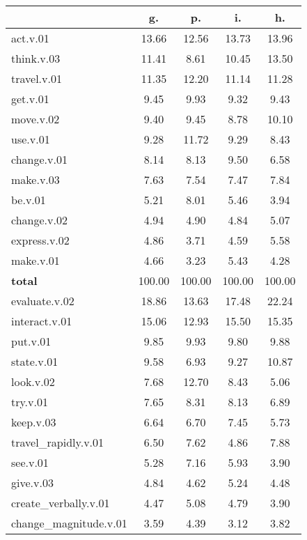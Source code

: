 \begin{table}[h!]
\begin{center}
\begin{tabular}{| l || c | c | c | c |}\hline
 & {\bf g.} & {\bf p.} & {\bf i.} & {\bf h.} \\\hline\hline
act.v.01 & 13.66  & 12.56  & 13.73  & 13.96 \\\hline
think.v.03 & 11.41  & 8.61  & 10.45  & 13.50 \\\hline
travel.v.01 & 11.35  & 12.20  & 11.14  & 11.28 \\\hline
get.v.01 & 9.45  & 9.93  & 9.32  & 9.43 \\\hline
move.v.02 & 9.40  & 9.45  & 8.78  & 10.10 \\\hline
use.v.01 & 9.28  & 11.72  & 9.29  & 8.43 \\\hline
change.v.01 & 8.14  & 8.13  & 9.50  & 6.58 \\\hline
make.v.03 & 7.63  & 7.54  & 7.47  & 7.84 \\\hline
be.v.01 & 5.21  & 8.01  & 5.46  & 3.94 \\\hline
change.v.02 & 4.94  & 4.90  & 4.84  & 5.07 \\\hline
express.v.02 & 4.86  & 3.71  & 4.59  & 5.58 \\\hline
make.v.01 & 4.66  & 3.23  & 5.43  & 4.28 \\\hline\hline
{{\bf total}} & 100.00  & 100.00  & 100.00  & 100.00 \\\hline\hline\hline
evaluate.v.02 & 18.86  & 13.63  & 17.48  & 22.24 \\\hline
interact.v.01 & 15.06  & 12.93  & 15.50  & 15.35 \\\hline
put.v.01 & 9.85  & 9.93  & 9.80  & 9.88 \\\hline
state.v.01 & 9.58  & 6.93  & 9.27  & 10.87 \\\hline
look.v.02 & 7.68  & 12.70  & 8.43  & 5.06 \\\hline
try.v.01 & 7.65  & 8.31  & 8.13  & 6.89 \\\hline
keep.v.03 & 6.64  & 6.70  & 7.45  & 5.73 \\\hline
travel\_rapidly.v.01 & 6.50  & 7.62  & 4.86  & 7.88 \\\hline
see.v.01 & 5.28  & 7.16  & 5.93  & 3.90 \\\hline
give.v.03 & 4.84  & 4.62  & 5.24  & 4.48 \\\hline
create\_verbally.v.01 & 4.47  & 5.08  & 4.79  & 3.90 \\\hline
change\_magnitude.v.01 & 3.59  & 4.39  & 3.12  & 3.82 \\\hline\hline

\end{tabular}
\end{center}
\end{table}
